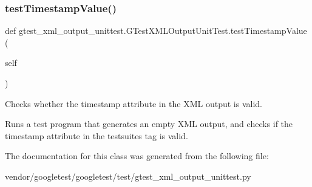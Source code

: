 \subsubsection{\texorpdfstring{test\+Timestamp\+Value()}{testTimestampValue()}}
{\footnotesize\ttfamily def gtest\+\_\+xml\+\_\+output\+\_\+unittest.\+G\+Test\+X\+M\+L\+Output\+Unit\+Test.\+test\+Timestamp\+Value (\begin{DoxyParamCaption}\item[{}]{self }\end{DoxyParamCaption})}

\begin{DoxyVerb}Checks whether the timestamp attribute in the XML output is valid.

Runs a test program that generates an empty XML output, and checks if
the timestamp attribute in the testsuites tag is valid.
\end{DoxyVerb}
 

The documentation for this class was generated from the following file\+:\begin{DoxyCompactItemize}
\item 
vendor/googletest/googletest/test/gtest\+\_\+xml\+\_\+output\+\_\+unittest.\+py\end{DoxyCompactItemize}
